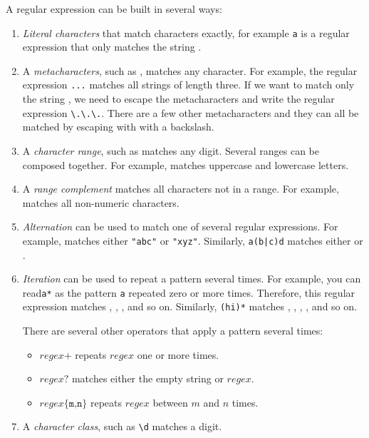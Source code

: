 \documentclass[9pt]{extbook}
\begin{document}
A regular expression can be built in several ways:

\begin{enumerate}

 \item  \emph{Literal characters} that match characters exactly, for example \texttt{a} is a regular expression that only matches the string .

  \item A \emph{metacharacters}, such as , matches any character. For example, the regular expression \texttt{...} matches all strings of length three. If we want to match only the string , we need to escape the metacharacters and write the regular expression \verb|\.\.\.|. There are a few other metacharacters and they can all be matched by escaping with with a backslash.

  \item A \emph{character range}, such as \scalainline{[0-9]} matches any digit. Several ranges can be composed together. For example, \scalainline{[A-Za-z]} matches uppercase and lowercase letters.

  \item A \emph{range complement} matches all characters not in a range. For example, \scalainline{[^ 0-9]} matches all non-numeric characters.

  \item \emph{Alternation} can be used to match one of several regular expressions. For example,  matches either \texttt{"abc"} or \texttt{"xyz"}. Similarly, \texttt{a(b|c)d} matches either  or .

  \item \emph{Iteration} can be used to repeat a pattern several times. For example, you can read\texttt{a*} as the pattern \texttt{a} repeated zero or more times. Therefore, this regular expression matches , , , and so on. Similarly, \texttt{(hi)*} matches , , , , and so on.

  There are several other operators that apply a pattern several times:

  \begin{itemize}
    \item $\mathit{regex}\texttt{+}$ repeats $\mathit{regex}$ one or more times.
    \item $\mathit{regex}\texttt{?}$ matches either the empty string or $\mathit{regex}$.
        \item $\mathit{regex}\texttt{\{m,n\}}$ repeats $\mathit{regex}$ between $m$ and $n$ times.
  \end{itemize}

  \item A \emph{character class}, such as \verb|\d| matches a digit.

\end{enumerate}
\end{document}
